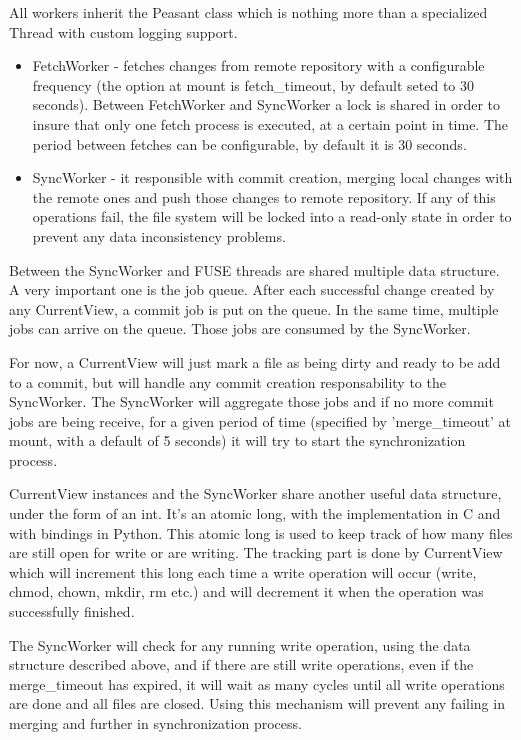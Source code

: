 All workers inherit the Peasant class which is nothing more than a specialized Thread with custom logging support.
\begin{itemize}
    \item FetchWorker - fetches changes from remote repository with a configurable frequency (the option at mount is fetch\_timeout, by default seted to 30 seconds). Between FetchWorker and SyncWorker a lock is shared in order to insure that only one fetch process is executed, at a certain point in time. The period between fetches can be configurable, by default it is 30 seconds.
    \item SyncWorker - it responsible with commit creation, merging local changes with the remote ones and push those changes to remote repository. If any of this operations fail, the file system will be locked into a read-only state in order to prevent any data inconsistency problems.
\end{itemize}

Between the SyncWorker and FUSE threads are shared multiple data structure. A very important one is the job queue. After each successful change created by any CurrentView, a commit job is put on the queue. In the same time, multiple jobs can arrive on the queue. Those jobs are consumed by the SyncWorker.

For now, a CurrentView will just mark a file as being dirty and ready to be add to a commit, but will handle any commit creation responsability to the SyncWorker. The SyncWorker will aggregate those jobs and if no more commit jobs are being receive, for a given period of time (specified by 'merge\_timeout' at mount, with a default of 5 seconds) it will try to start the synchronization process.

CurrentView instances and the SyncWorker share another useful data structure, under the form of an int. It's an atomic long, with the implementation in C and with bindings in Python. This atomic long is used to keep track of how many files are still open for write or are writing. The tracking part is done by CurrentView which will increment this long each time a write operation will occur (write, chmod, chown, mkdir, rm etc.) and will decrement it when the operation was successfully finished.

The SyncWorker will check for any running write operation, using the data structure described above, and if there are still write operations, even if the merge\_timeout has expired, it will wait as many cycles until all write operations are done and all files are closed. Using this mechanism will prevent any failing in merging  and further in synchronization process.

